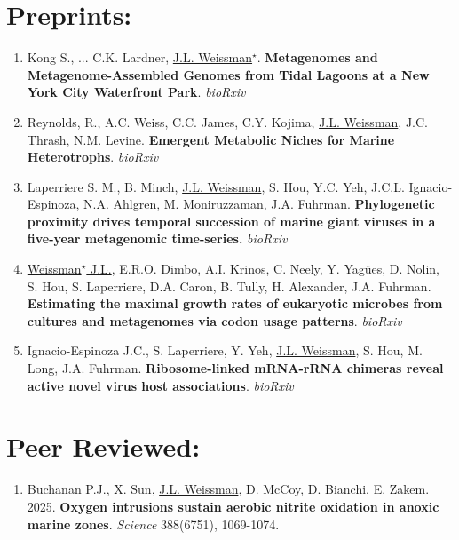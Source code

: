 \documentclass[]{res}
\begin{document}
\begin{resume}
 
 \section{Preprints:} \vspace{0mm}
  
 \begin{enumerate}[leftmargin=*]
 \setlength\itemsep{0.25em}
 
 \item Kong S., ... C.K. Lardner, \underline{J.L. Weissman$^\star$}. {\bf Metagenomes and Metagenome-Assembled Genomes from Tidal Lagoons at a New York City Waterfront Park}. \emph{bioRxiv}
 

\item Reynolds, R., A.C. Weiss, C.C. James, C.Y. Kojima, \underline{J.L. Weissman}, J.C. Thrash, N.M. Levine. {\bf Emergent Metabolic Niches for Marine Heterotrophs}. \emph{bioRxiv}

\item Laperriere S. M., B. Minch, \underline{J.L. Weissman}, S. Hou, Y.C. Yeh, J.C.L. Ignacio-Espinoza, N.A. Ahlgren, M. Moniruzzaman, J.A. Fuhrman. {\bf Phylogenetic proximity drives temporal succession of marine giant viruses in a five-year metagenomic time-series.} \emph{bioRxiv}

\item \underline{Weissman$^\star$ J.L.}, E.R.O. Dimbo, A.I. Krinos, C. Neely, Y. Yag\"{ues}, D. Nolin, S. Hou, S. Laperriere, D.A. Caron, B. Tully, H. Alexander, J.A. Fuhrman. {\bf Estimating the maximal growth rates of eukaryotic microbes from cultures and metagenomes via codon usage patterns}. \emph{bioRxiv}

\item Ignacio-Espinoza J.C., S. Laperriere, Y. Yeh, \underline{J.L. Weissman}, S. Hou, M. Long, J.A. Fuhrman. {\bf Ribosome-linked mRNA-rRNA chimeras reveal active novel virus host associations}. \emph{bioRxiv}
 

\end{enumerate} 

  
 \section{Peer Reviewed:} \vspace{0mm}
 
\begin{enumerate}[leftmargin=*]
 \setlength\itemsep{0.25em}
 
 
\item Buchanan P.J., X. Sun, \underline{J.L. Weissman}, D. McCoy, D. Bianchi, E. Zakem. 2025. {\bf Oxygen intrusions sustain aerobic nitrite 
oxidation in anoxic marine zones}. \emph{Science} 388(6751), 1069-1074.
 

\end{enumerate}
\end{resume}
\end{document}
